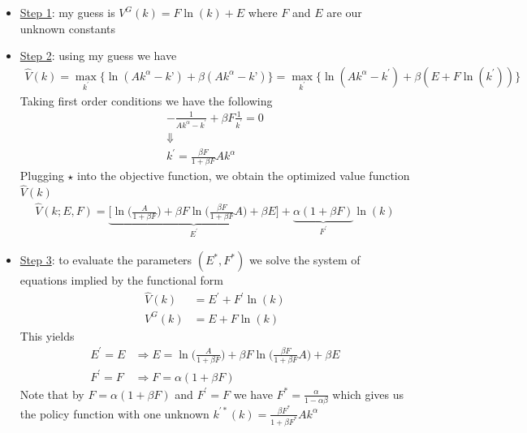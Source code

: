 \documentclass{article}
\begin{document}
\begin{itemize}
\begin{itemize}
\begin{itemize}
             \begin{itemize}
                 \item  \underline{Step 1}: my guess is $V^{G} (k) = F \ln (k) + E$ where $F$ and $E$ are our unknown constants
                 \item  \underline{Step 2}: using my guess we have
                 \begin{gather*}
                     \widehat{V}(k) = \max_{k^{'}} \Big\{ \ln(Ak^{\alpha} - k’) + \beta (Ak^{\alpha} - k’) \Big\} = \max_{k^{'}} \Big\{ \ln(Ak^{\alpha} - k^{'}) + \beta(E + F \ln (k^{'})) \Big\}
                 \end{gather*}
                 Taking first order conditions we have the following
                 \begin{gather*}
                    -\frac{1}{Ak^{\alpha}-k^{'}} + \beta F \frac{1}{k^{'}} = 0 \\
                    \Downarrow \\
                    k^{'} = \frac{\beta F}{1 + \beta F} Ak^{\alpha} \tag{$\star$}
                 \end{gather*}
                 Plugging $\star$ into the objective function, we obtain the optimized value function $\widehat{V}(k)$
                 \begin{gather*}
                     \widehat{V}(k;E,F) = \underbrace{\bigg[ \ln \Big(\frac{A}{1+\beta F} \Big) + \beta F \ln \Big( \frac{\beta F}{1 + \beta F} A \Big) + \beta E \bigg]}_{E^{'}} + \underbrace{\alpha(1+\beta F)}_{F^{'}} \ln(k)
                 \end{gather*}
                 \item  \underline{Step 3}: to evaluate the parameters $(E^{*}, F^{*})$ we solve the system of equations implied by the functional form
                 \begin{align*}
                     \widehat{V}(k) &= E^{'} + F^{'} \ln (k) \\
                     V^{G}(k) &= E + F \ln(k)
                 \end{align*}
             This yields
                 \begin{align*}
                     E^{'} = E &\Rightarrow E = \ln \Big(\frac{A}{1+\beta F} \Big) + \beta F \ln \Big( \frac{\beta F}{1 + \beta F} A \Big) + \beta E \\
                     F^{'} = F &\Rightarrow F = \alpha(1+\beta F)
                 \end{align*}
                 Note that by $F = \alpha(1+\beta F)$ and $F^{'} = F$ we have $F^{*} = \tfrac{\alpha}{1 - \alpha \beta}$ which gives us the policy function with one unknown $k^{'*}(k) = \tfrac{\beta F^{*}}{1 + \beta F^{*}} A k^{\alpha}$
             \end{itemize}
         \end{itemize}
    \end{itemize}
\end{itemize}
\end{document}
